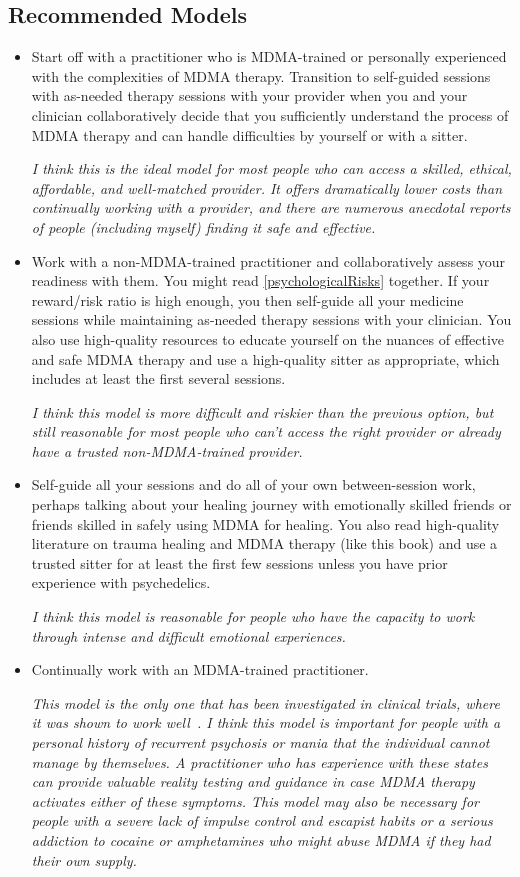\documentclass[11pt,oneside]{book}
\let\cite\parencite
\begin{document}
\subsection*{Recommended Models}
\begin{itemize}
    \item Start off with a practitioner who is MDMA-trained or personally experienced with the complexities of MDMA therapy. Transition to self-guided sessions with as-needed therapy sessions with your provider when you and your clinician collaboratively decide that you sufficiently understand the process of MDMA therapy and can handle difficulties by yourself or with a sitter.
    
    \textit{I think this is the ideal model for most people who can access a skilled, ethical, affordable, and well-matched provider. It offers dramatically lower costs than continually working with a provider, and there are numerous anecdotal reports of people (including myself) finding it safe and effective.}
    \item Work with a non-MDMA-trained practitioner and collaboratively assess your readiness with them. You might read \cref{psychologicalRisks} together. If your reward/risk ratio is high enough, you then self-guide all your medicine sessions while maintaining as-needed therapy sessions with your clinician. You also use high-quality resources to educate yourself on the nuances of effective and safe MDMA therapy and use a high-quality sitter as appropriate, which includes at least the first several sessions.
    
    \textit{I think this model is more difficult and riskier than the previous option, but still reasonable for most people who can't access the right provider or already have a trusted non-MDMA-trained provider.}
    \item Self-guide all your sessions and do all of your own between-session work, perhaps talking about your healing journey with emotionally skilled friends or friends skilled in safely using MDMA for healing. You also read high-quality literature on trauma healing and MDMA therapy (like this book) and use a trusted sitter for at least the first few sessions unless you have prior experience with psychedelics.
    
    \textit{I think this model is reasonable for people who have the capacity to work through intense and difficult emotional experiences.}
    \item Continually work with an MDMA-trained practitioner.
    
    \textit{This model is the only one that has been investigated in clinical trials, where it was shown to work well~\cite{mitchellMDMAClinicalTrial2}. I think this model is important for people with a personal history of recurrent psychosis or mania that the individual cannot manage by themselves. A practitioner who has experience with these states can provide valuable reality testing and guidance in case MDMA therapy activates either of these symptoms. This model may also be necessary for people with a severe lack of impulse control and escapist habits or a serious addiction to cocaine or amphetamines who might abuse MDMA if they had their own supply.}
\end{itemize}
\end{document}
